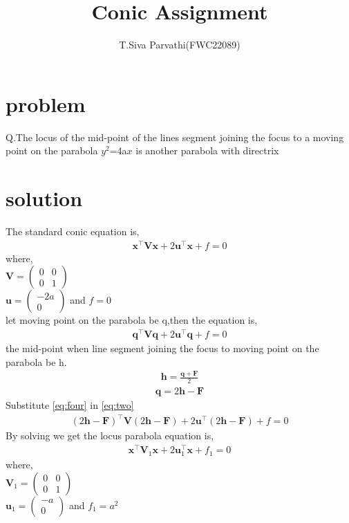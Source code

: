 \documentclass[journal,12pt,twocolumn]{IEEEtran}
\title{\mytitle}
\title{
Conic Assignment 
}
\author{T.Siva Parvathi(FWC22089)}
\newcommand{\myvec}[1]{\ensuremath{\begin{pmatrix}#1\end{pmatrix}}}
\let\vec\mathbf
\begin{document}
\maketitle
\tableofcontents
\bigskip


\section{\textbf{problem}}
Q.The locus of the mid-point of the lines segment joining the focus to a moving point on the parabola $y^2$=4a$x$ is another parabola with directrix

\section{\textbf{solution}}
The standard conic equation is,\\
\begin{align}
\label{eq:one}
\vec{x}^\top\vec{Vx}+2\vec{u}^\top\vec{x}+f=0
\end{align} 
 where,\\
$\vec{V}=\myvec{0&0 \\0&1}$\\ $\vec{u}=\myvec{-2a\\0}$ and $f=0$ \\
let moving point on the parabola be q,then the equation is,
\begin{align}
\label{eq:two}
\vec{q}^\top\vec{Vq}+2\vec{u}^\top\vec{q}+f=0
\end{align}
the mid-point when line segment joining the focus to moving point on the parabola be h.
\begin{align}
\label{eq:three}
\vec{h}=\frac{\vec{q+F}}{2}
\end{align}
\begin{align}
\label{eq:four}
\vec{q}=2\vec{h}-\vec{F}
\end{align}
Substitute \eqref{eq:four} in \eqref{eq:two}\\
\begin{align}
\label{eq:five}
(2\vec{h}-\vec{F})^\top\vec{V}(2\vec{h}-\vec{F})+2\vec{u}^\top(2\vec{h}-\vec{F})+f=0
\end{align}
By solving we get the locus parabola equation is, \\
\begin{align}
\label{eq:six}
\vec{x}^\top\vec{V}_{1}\vec{x}+2\vec{u}_{1}^\top\vec{x}+f_1=0
\end{align} 
where,\\
$\vec{V}_{1}=\myvec{0&0 \\0&1}$\\ $\vec{u}_{1}=\myvec{-a\\0}$ and $f_1=a^2$ \\
\end{document}
